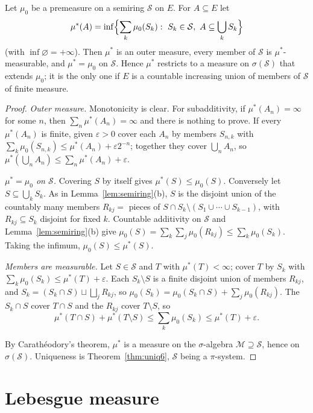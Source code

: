 \begin{theorem}\label{thm:extension}
Let $\mu_0$ be a premeasure on a semiring $\mathcal S$ on $E$. For $A\subseteq E$ let
\[\mu^*(A)=\inf\Bigl\{\sum_k\mu_0(S_k):\ S_k\in\mathcal S,\ A\subseteq\bigcup_kS_k\Bigr\}\]
(with $\inf\varnothing=+\infty$). Then $\mu^*$ is an outer measure, every member of $\mathcal S$ is $\mu^*$-measurable, and $\mu^*=\mu_0$ on $\mathcal S$. Hence $\mu^*$ restricts to a measure on
$\sigma(\mathcal S)$ that extends $\mu_0$; it is the only one if $E$ is a countable increasing union of members of $\mathcal S$ of finite measure.
\end{theorem}
\begin{proof}
\emph{Outer measure.} Monotonicity is clear. For subadditivity, if $\mu^*(A_n)=\infty$ for some $n$, then $\sum_n\mu^*(A_n)=\infty$ and there is nothing to prove. If every $\mu^*(A_n)$ is finite, given $\varepsilon>0$ cover each $A_n$ by members $S_{n,k}$ with $\sum_k\mu_0(S_{n,k})\le\mu^*(A_n)+\varepsilon2^{-n}$; together
they cover $\bigcup_nA_n$, so $\mu^*(\bigcup_nA_n)\le\sum_n\mu^*(A_n)+\varepsilon$.

\emph{$\mu^*=\mu_0$ on $\mathcal S$.} Covering $S$ by itself gives $\mu^*(S)\le\mu_0(S)$. Conversely let $S\subseteq\bigcup_kS_k$. As in Lemma~\ref{lem:semiring}(b), $S$ is the disjoint union of the countably many
members $R_{kj}=$ pieces of $S\cap S_k\setminus(S_1\cup\cdots\cup S_{k-1})$, with $R_{kj}\subseteq S_k$ disjoint for fixed $k$. Countable additivity on $\mathcal S$ and Lemma~\ref{lem:semiring}(b) give
$\mu_0(S)=\sum_k\sum_j\mu_0(R_{kj})\le\sum_k\mu_0(S_k)$. Taking the infimum, $\mu_0(S)\le\mu^*(S)$.

\emph{Members are measurable.} Let $S\in\mathcal S$ and $T$ with $\mu^*(T)<\infty$; cover $T$ by $S_k$ with $\sum_k\mu_0(S_k)\le\mu^*(T)+\varepsilon$. Each $S_k\setminus S$ is a finite disjoint union of members $R_{kj}$,
and $S_k=(S_k\cap S)\sqcup\bigsqcup_jR_{kj}$, so $\mu_0(S_k)=\mu_0(S_k\cap S)+\sum_j\mu_0(R_{kj})$. The $S_k\cap S$ cover $T\cap S$ and the $R_{kj}$ cover $T\setminus S$, so
\[\mu^*(T\cap S)+\mu^*(T\setminus S)\le\sum_k\mu_0(S_k)\le\mu^*(T)+\varepsilon.\]

By Carath\'eodory's theorem, $\mu^*$ is a measure on the $\sigma$-algebra $\mathcal M\supseteq\mathcal S$, hence on $\sigma(\mathcal S)$. Uniqueness is Theorem~\ref{thm:uniq6}, $\mathcal S$ being a $\pi$-system.
\end{proof}

\section{Lebesgue measure}

